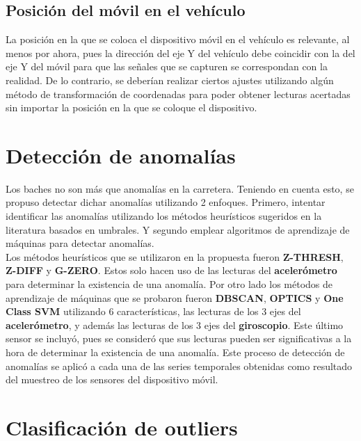 	\subsection{Posición del móvil en el vehículo}
		La posición en la que se coloca el dispositivo móvil en el vehículo es relevante, al menos por ahora, pues la
		dirección del eje Y del vehículo debe coincidir con la del eje Y del móvil para que las señales que se capturen
		se correspondan con la realidad. De lo contrario, se deberían realizar ciertos ajustes utilizando algún método de
		transformación de coordenadas para poder obtener lecturas acertadas sin importar la posición en la que se coloque
		el dispositivo.

\section{Detección de anomalías}
	Los baches no son más que anomalías en la carretera. Teniendo en cuenta esto, se propuso detectar dichar anomalías utilizando
	2 enfoques. Primero, intentar identificar las anomalías utilizando los métodos heurísticos sugeridos en la literatura basados
	en umbrales. Y segundo emplear algoritmos de aprendizaje de máquinas para detectar anomalías.\\
	\indent Los métodos heurísticos que se utilizaron en la propuesta fueron \textbf{Z-THRESH}, \textbf{Z-DIFF} y \textbf{G-ZERO}.
	Estos solo hacen uso de las lecturas del \textbf{acelerómetro} para determinar la existencia de una anomalía. Por otro lado los
	métodos de aprendizaje de máquinas que se probaron fueron \textbf{DBSCAN}, \textbf{OPTICS} y \textbf{One Class SVM} utilizando 
	6 características, las lecturas de los 3 ejes del \textbf{acelerómetro}, y además las lecturas de los 3 ejes del \textbf{giroscopio}.
	Este último sensor se incluyó, pues se consideró que sus lecturas pueden ser significativas a la hora de determinar la existencia de una 
	anomalía. Este proceso de detección de anomalías se aplicó a cada una de las series temporales obtenidas como resultado del muestreo
	de los sensores del dispositivo móvil.


\section{Clasificación de outliers}


